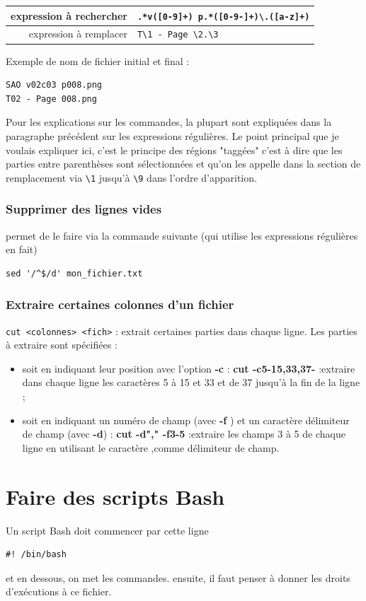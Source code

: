 \documentclass[a4paper,twoside]{article}
\begin{document}
\begin{tabular}{|r|l|}
\hline
expression à rechercher & \verb|.*v([0-9]+) p.*([0-9-]+)\.([a-z]+)|\\\hline
expression à remplacer & \verb|T\1 - Page \2.\3|\\\hline
\end{tabular}

Exemple de nom de fichier initial et final :
\begin{verbatim}
SAO v02c03 p008.png
T02 - Page 008.png
\end{verbatim}

Pour les explications sur les commandes, la plupart sont expliquées dans la paragraphe précédent sur les expressions régulières. Le point principal que je voulais expliquer ici, c'est le principe des régions "taggées" c'est à dire que les parties entre parenthèses sont sélectionnées et qu'on les appelle dans la section de remplacement via \verb|\1| jusqu'à \verb|\9| dans l'ordre d'apparition.

\subsubsection{Supprimer des lignes vides}
 permet de le faire via la commande suivante (qui utilise les expressions régulières en fait)

\begin{verbatim}
sed '/^$/d' mon_fichier.txt
\end{verbatim}

\subsubsection{Extraire certaines colonnes d'un fichier}
\texttt{cut <colonnes> <fich>} : extrait certaines parties dans chaque ligne. Les parties à extraire sont spécifiées :
\begin{itemize}
\item soit en indiquant leur position avec l’option \textbf{-c} : \textbf{cut -c5-15,33,37-} :extraire dans chaque ligne les caractères 5 à 15 et 33 et de 37 jusqu’à la fin de la ligne ;
\item soit en indiquant un numéro de champ (avec \textbf{-f} ) et un caractère délimiteur de champ (avec \textbf{-d}) : \textbf{cut -d"," -f3-5} :extraire les champs 3 à 5 de chaque ligne en utilisant le caractère \og,\fg comme délimiteur de champ.
\end{itemize}

\section{Faire des scripts Bash}
Un script Bash doit commencer par cette ligne
\begin{verbatim}
#! /bin/bash
\end{verbatim}
et en dessous, on met les commandes. ensuite, il faut penser à donner les droits d'exécutions à ce fichier.
\end{document}
